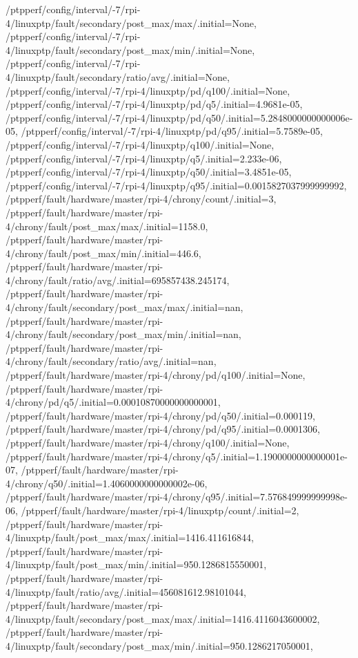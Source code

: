 {    /ptpperf/config/interval/-7/rpi-4/linuxptp/fault/secondary/post_max/max/.initial=None,
    /ptpperf/config/interval/-7/rpi-4/linuxptp/fault/secondary/post_max/min/.initial=None,
    /ptpperf/config/interval/-7/rpi-4/linuxptp/fault/secondary/ratio/avg/.initial=None,
    /ptpperf/config/interval/-7/rpi-4/linuxptp/pd/q100/.initial=None,
    /ptpperf/config/interval/-7/rpi-4/linuxptp/pd/q5/.initial=4.9681e-05,
    /ptpperf/config/interval/-7/rpi-4/linuxptp/pd/q50/.initial=5.2848000000000006e-05,
    /ptpperf/config/interval/-7/rpi-4/linuxptp/pd/q95/.initial=5.7589e-05,
    /ptpperf/config/interval/-7/rpi-4/linuxptp/q100/.initial=None,
    /ptpperf/config/interval/-7/rpi-4/linuxptp/q5/.initial=2.233e-06,
    /ptpperf/config/interval/-7/rpi-4/linuxptp/q50/.initial=3.4851e-05,
    /ptpperf/config/interval/-7/rpi-4/linuxptp/q95/.initial=0.0015827037999999992,
    /ptpperf/fault/hardware/master/rpi-4/chrony/count/.initial=3,
    /ptpperf/fault/hardware/master/rpi-4/chrony/fault/post_max/max/.initial=1158.0,
    /ptpperf/fault/hardware/master/rpi-4/chrony/fault/post_max/min/.initial=446.6,
    /ptpperf/fault/hardware/master/rpi-4/chrony/fault/ratio/avg/.initial=695857438.245174,
    /ptpperf/fault/hardware/master/rpi-4/chrony/fault/secondary/post_max/max/.initial=nan,
    /ptpperf/fault/hardware/master/rpi-4/chrony/fault/secondary/post_max/min/.initial=nan,
    /ptpperf/fault/hardware/master/rpi-4/chrony/fault/secondary/ratio/avg/.initial=nan,
    /ptpperf/fault/hardware/master/rpi-4/chrony/pd/q100/.initial=None,
    /ptpperf/fault/hardware/master/rpi-4/chrony/pd/q5/.initial=0.00010870000000000001,
    /ptpperf/fault/hardware/master/rpi-4/chrony/pd/q50/.initial=0.000119,
    /ptpperf/fault/hardware/master/rpi-4/chrony/pd/q95/.initial=0.0001306,
    /ptpperf/fault/hardware/master/rpi-4/chrony/q100/.initial=None,
    /ptpperf/fault/hardware/master/rpi-4/chrony/q5/.initial=1.1900000000000001e-07,
    /ptpperf/fault/hardware/master/rpi-4/chrony/q50/.initial=1.4060000000000002e-06,
    /ptpperf/fault/hardware/master/rpi-4/chrony/q95/.initial=7.576849999999998e-06,
    /ptpperf/fault/hardware/master/rpi-4/linuxptp/count/.initial=2,
    /ptpperf/fault/hardware/master/rpi-4/linuxptp/fault/post_max/max/.initial=1416.411616844,
    /ptpperf/fault/hardware/master/rpi-4/linuxptp/fault/post_max/min/.initial=950.1286815550001,
    /ptpperf/fault/hardware/master/rpi-4/linuxptp/fault/ratio/avg/.initial=456081612.98101044,
    /ptpperf/fault/hardware/master/rpi-4/linuxptp/fault/secondary/post_max/max/.initial=1416.4116043600002,
    /ptpperf/fault/hardware/master/rpi-4/linuxptp/fault/secondary/post_max/min/.initial=950.1286217050001,
}
